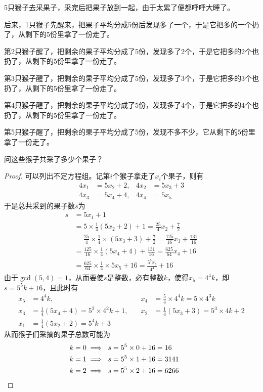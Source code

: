 \begin{example}
  5只猴子去采果子，采完后把果子放到一起，由于太累了便都呼呼大睡了。

  后来，1只猴子先醒来，把果子平均分成5份后发现多了一个，于是它把多的一个扔了，从剩下的5份里拿了一份走了。

  第2只猴子醒了，把剩余的果子平均分成了5份，发现多了2个，于是它把多的2个也扔了，从剩下的5份里拿了一份走了。

  第3只猴子醒了，把剩余的果子平均分成了5份，发现多了3个，于是它把多的3个也扔了，从剩下的5份里拿了一份走了。

  第4只猴子醒了，把剩余的果子平均分成了5份，发现多了4个，于是它把多的4个也扔了，从剩下的5份里拿了一份走了。

  第5只猴子醒了，把剩余的果子平均分成了5份，发现不多不少，它从剩下的5份里拿了一份走了。

  问这些猴子共采了多少个果子？
\end{example}
\begin{proof}
  可以列出不定方程组。记第$i$个猴子拿走了$x_i$个果子，则有
  \begin{align*}
    4x_1 &= 5x_2 + 2, & 4x_2 &= 5x_3 + 3\\
    4x_3 &= 5x_4 + 4, & 4x_4 &= 5x_5
  \end{align*}
  于是总共采到的果子数$s$为
  \begin{align*}
    s&=5x_1 + 1 \\
     &=5\times\frac14 (5x_2+2) + 1 = \frac{25}{4}x_2 + \frac72\\
     &=\frac{25}{4}\times \frac14\times (5x_3+3) + \frac72 = \frac{125}{16}x_3 + \frac{131}{16}\\
     &=\frac{125}{16}\times \frac14 (5x_4+4) + \frac{131}{16} = \frac{625}{64}x_4 + 16\\
     &=\frac{625}{64}\times \frac14\times5x_5 + 16 = \frac{5^5x_5}{4^4} + 16
  \end{align*}
  由于$\gcd(5,4)=1$，从而要使$s$是整数，必有整数$k$，使得$x_5=4^4k$，即$s=5^5k + 16$，且此时有
  \begin{align*}
    x_5& = 4^4 k,&\quad x_4&=\frac54\times 4^4k = 5\times4^3k \\
    x_3&=\frac14(5x_4+4) = 5^2\times4^2k + 1,&\quad x_2 &= \frac14(5x_3+3) = 5^3\times 4k + 2\\
    x_1&=\frac14(5x_2 + 2) = 5^4k + 3
  \end{align*}
  从而猴子们采摘的果子总数可能为
  \begin{align*}
    k&=0 \implies\  s= 5^5\times0 + 16=16\\
    k&=1 \implies\  s= 5^5\times1 + 16=3141\\
    k&=2 \implies\  s= 5^5\times2 + 16=6266&&\qedhere
  \end{align*}
\end{proof}

